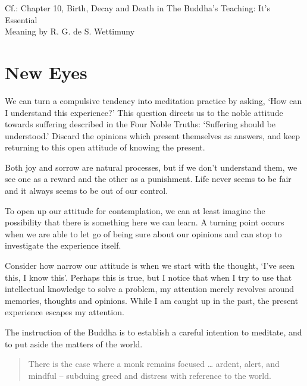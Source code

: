 {\noindent\footnotesize
Cf.: Chapter 10, Birth, Decay and Death in The Buddha's Teaching: It's Essential\\ Meaning by R. G. de S. Wettimuny
\par}


\clearpage
\normalpagelayout

\section{New Eyes}


\noindent We can turn a compulsive tendency into meditation practice by
asking, `How can I understand this experience?' This question directs us
to the noble attitude towards suffering described in the Four Noble
Truths: `Suffering should be understood.' Discard the opinions which
present themselves as answers, and keep returning to this open attitude
of knowing the present.

Both joy and sorrow are natural processes, but if we don't understand
them, we see one as a reward and the other as a punishment. Life never
seems to be fair and it always seems to be out of our control.

To open up our attitude for contemplation, we can at least imagine the
possibility that there is something here we can learn. A turning point
occurs when we are able to let go of being sure about our opinions and
can stop to investigate the experience itself.

Consider how narrow our attitude is when we start with the thought,
`I've seen this, I know this'. Perhaps this is true, but I notice that
when I try to use that intellectual knowledge to solve a problem, my
attention merely revolves around memories, thoughts and opinions. While
I am caught up in the past, the present experience escapes my attention.

The instruction of the Buddha is to establish a careful intention to
meditate, and to put aside the matters of the world.

\clearpage

\begin{quote}
There is the case where a monk remains focused \ldots{} ardent, alert,
and mindful -- subduing greed and distress with reference to the world.

\bigskip

\end{quote}

